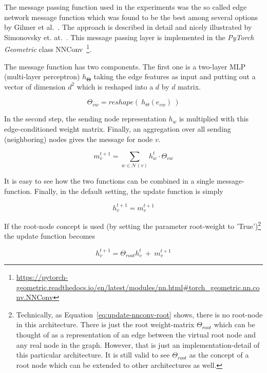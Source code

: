 The message passing function used in the experiments was the so called edge network message function which was found to be the best among several options by Gilmer et al.~\cite{Gilmer2017}. The approach is described in detail and nicely illustrated by Simonovsky et. at.~\cite{Simonovsky2017}. This message passing layer is implemented in the \textit{PyTorch Geometric} class NNConv~\footnote{\url{https://pytorch-geometric.readthedocs.io/en/latest/modules/nn.html\#torch_geometric.nn.conv.NNConv}}\label{fn:pytorch-geometric-nn-docs}.


The message function has two components. The first one is a two-layer MLP (multi-layer perceptron)  $h_{\mathbf{\Theta}}$ taking the edge features as input and putting out a vector of dimension $d^2$ which is reshaped into a $d$ by $d$ matrix.

\begin{equation}
	\Theta_{vw} = reshape(~h_{\Theta}(e_{vw})~)
\end{equation}

In the second step, the sending node representation $h_w$ is multiplied with this edge-conditioned weight matrix. Finally, an aggregation over all sending (neighboring) nodes gives the message for node $v$.

\begin{equation}
 m_v^{t+1} = \sum_{w \in \mathcal{N}(v)} h_w^t \cdot \Theta_{vw}
\end{equation}

It is easy to see how the two functions can be combined in a single message-function. Finally, in the default setting, the update function is simply

\begin{equation}\label{eq:update-nnconv-simple}
	h_v^{t+1} = m_v^{t+1}
\end{equation}

If the root-node concept is used (by setting the parameter root-weight to 'True')\footnote{
	Technically, as Equation~\ref{eq:update-nnconv-root} shows, there is no root-node in this architecture. There is just the root weight-matrix $\Theta_{root}$ which can be thought of as a representation of an edge between the virtual root node and any real node in the graph. However, that is just an implementation-detail of this particular architecture. It is still valid to see $\Theta_{root}$ as the concept of a root node which can be extended to other architectures as well.
} the update function becomes

\begin{equation}\label{eq:update-nnconv-root}
h_v^{t+1} = \Theta_{root}h_v^t~+~m_v^{t+1}
\end{equation}




